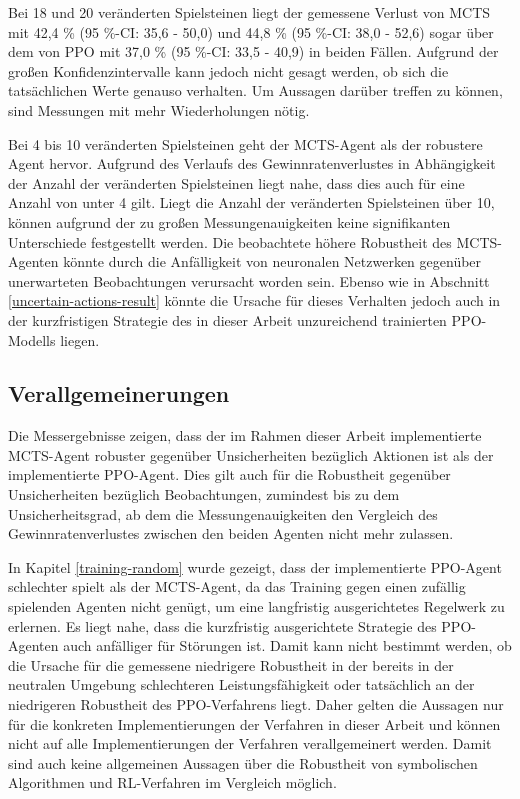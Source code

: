 Bei 18 und 20 veränderten Spielsteinen liegt der gemessene Verlust von MCTS mit 42,4 \% (95 \%-CI: 35,6 - 50,0) und 44,8 \% (95 \%-CI: 38,0 - 52,6) sogar über dem von PPO mit 37,0 \% (95 \%-CI: 33,5 - 40,9) in beiden Fällen. Aufgrund der großen Konfidenzintervalle kann jedoch nicht gesagt werden, ob sich die tatsächlichen Werte genauso verhalten. Um Aussagen darüber treffen zu können, sind Messungen mit mehr Wiederholungen nötig.

Bei 4 bis 10 veränderten Spielsteinen geht der MCTS-Agent als der robustere Agent hervor. Aufgrund des Verlaufs des Gewinnratenverlustes in Abhängigkeit der Anzahl der veränderten Spielsteinen liegt nahe, dass dies auch für eine Anzahl von unter 4 gilt. Liegt die Anzahl der veränderten Spielsteinen über 10, können aufgrund der zu großen Messungenauigkeiten keine signifikanten Unterschiede festgestellt werden. Die beobachtete höhere Robustheit des MCTS-Agenten könnte durch die Anfälligkeit von neuronalen Netzwerken gegenüber unerwarteten Beobachtungen verursacht worden sein. Ebenso wie in Abschnitt \ref{uncertain-actions-result} könnte die Ursache für dieses Verhalten jedoch auch in der kurzfristigen Strategie des in dieser Arbeit unzureichend trainierten PPO-Modells liegen.

\subsection{Verallgemeinerungen}

Die Messergebnisse zeigen, dass der im Rahmen dieser Arbeit implementierte MCTS-Agent robuster gegenüber Unsicherheiten bezüglich Aktionen ist als der implementierte PPO-Agent. Dies gilt auch für die Robustheit gegenüber Unsicherheiten bezüglich Beobachtungen, zumindest bis zu dem Unsicherheitsgrad, ab dem die Messungenauigkeiten den Vergleich des Gewinnratenverlustes zwischen den beiden Agenten nicht mehr zulassen.

In Kapitel \ref{training-random} wurde gezeigt, dass der implementierte PPO-Agent schlechter spielt als der MCTS-Agent, da das Training gegen einen zufällig spielenden Agenten nicht genügt, um eine langfristig ausgerichtetes Regelwerk zu erlernen. Es liegt nahe, dass die kurzfristig ausgerichtete Strategie des PPO-Agenten auch anfälliger für Störungen ist. Damit kann nicht bestimmt werden, ob die Ursache für die gemessene niedrigere Robustheit in der bereits in der neutralen Umgebung schlechteren Leistungsfähigkeit oder tatsächlich an der niedrigeren Robustheit des PPO-Verfahrens liegt. Daher gelten die Aussagen nur für die konkreten Implementierungen der Verfahren in dieser Arbeit und können nicht auf alle Implementierungen der Verfahren verallgemeinert werden. Damit sind auch keine allgemeinen Aussagen über die Robustheit von symbolischen Algorithmen und RL-Verfahren im Vergleich möglich.

